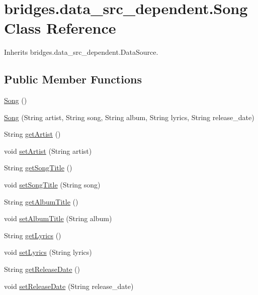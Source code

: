 \hypertarget{classbridges_1_1data__src__dependent_1_1_song}{}\section{bridges.\+data\+\_\+src\+\_\+dependent.\+Song Class Reference}
\label{classbridges_1_1data__src__dependent_1_1_song}


Inherits bridges.\+data\+\_\+src\+\_\+dependent.\+Data\+Source.

\subsection*{Public Member Functions}
\begin{DoxyCompactItemize}
\item 
\hyperlink{classbridges_1_1data__src__dependent_1_1_song_a824052caca0b9c03d07c42e9e7740020}{Song} ()
\item 
\hyperlink{classbridges_1_1data__src__dependent_1_1_song_a78506e63f4d91dc1f0d821050a093ad6}{Song} (String artist, String song, String album, String lyrics, String release\+\_\+date)
\item 
String \hyperlink{classbridges_1_1data__src__dependent_1_1_song_a7aa3685df74e4fbb5e0d4d4750cf7685}{get\+Artist} ()
\item 
void \hyperlink{classbridges_1_1data__src__dependent_1_1_song_adffaec742bf945ec8c81244fdafd47d2}{set\+Artist} (String artist)
\item 
String \hyperlink{classbridges_1_1data__src__dependent_1_1_song_a4e7b8aed1aec243f2798a30e51091d72}{get\+Song\+Title} ()
\item 
void \hyperlink{classbridges_1_1data__src__dependent_1_1_song_a9d7540c0e6cca53ae3a105885aac5622}{set\+Song\+Title} (String song)
\item 
String \hyperlink{classbridges_1_1data__src__dependent_1_1_song_a94b26a355aa1e30938bcc896a8bd902f}{get\+Album\+Title} ()
\item 
void \hyperlink{classbridges_1_1data__src__dependent_1_1_song_ab9f9d24be49c3a0a66c9ff9e271b007e}{set\+Album\+Title} (String album)
\item 
String \hyperlink{classbridges_1_1data__src__dependent_1_1_song_ab4aa2c51f7fdce80d9c178d6f0e0aae8}{get\+Lyrics} ()
\item 
void \hyperlink{classbridges_1_1data__src__dependent_1_1_song_a30889eb971f474e9d62782ddb82c1846}{set\+Lyrics} (String lyrics)
\item 
String \hyperlink{classbridges_1_1data__src__dependent_1_1_song_a05520675a0a2f2e60583887b8c69cde4}{get\+Release\+Date} ()
\item 
void \hyperlink{classbridges_1_1data__src__dependent_1_1_song_a6534e543a295b29858cf98be7a4e276e}{set\+Release\+Date} (String release\+\_\+date)
\end{DoxyCompactItemize}


